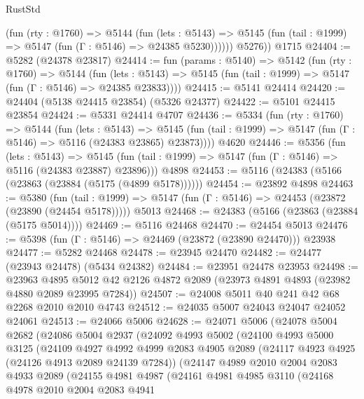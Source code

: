 \begin{lexlean}{RustStd}
\begin{coremodule}
{\begin{coremodule}
{{{{{{{{{{{{{{{{{{{{{{{{{{{{{{{            (fun (rty : @1760) =>
            @5144
              (fun (lets : @5143) =>
              @5145 (fun (tail : @1999) => @5147 (fun (Γ : @5146) => @24385 @5230))))))
        @5276))
    @1715
@24404 := @5282 (@24378 @23817)
@24414 := fun (params : @5140) =>
  @5142
    (fun (rty : @1760) =>
    @5144
      (fun (lets : @5143) =>
      @5145 (fun (tail : @1999) => @5147 (fun (Γ : @5146) => @24385 @23833))))
@24415 := @5141 @24414
@24420 := @24404 (@5138 @24415 @23854) (@5326 @24377)
@24422 := @5101 @24415 @23854
@24424 := @5331 @24414 @4707
@24436 := @5334
    (fun (rty : @1760) =>
    @5144
      (fun (lets : @5143) =>
      @5145 (fun (tail : @1999) => @5147 (fun (Γ : @5146) => @5116 (@24383 @23865) @23873))))
    @4620
@24446 := @5356
    (fun (lets : @5143) =>
    @5145 (fun (tail : @1999) => @5147 (fun (Γ : @5146) => @5116 (@24383 @23887) @23896)))
    @4898
@24453 := @5116 (@24383 (@5166 (@23863 (@23884 (@5175 (@4899 @5178))))))
@24454 := @23892 @4898
@24463 := @5380
    (fun (tail : @1999) => @5147 (fun (Γ : @5146) => @24453 (@23872 (@23890 (@24454 @5178)))))
    @5013
@24468 := @24383 (@5166 (@23863 (@23884 (@5175 @5014))))
@24469 := @5116 @24468
@24470 := @24454 @5013
@24476 := @5398 (fun (Γ : @5146) => @24469 (@23872 (@23890 @24470))) @23938
@24477 := @5282 @24468
@24478 := @23945 @24470
@24482 := @24477 (@23943 @24478) (@5434 @24382)
@24484 := @23951 @24478 @23953
@24498 := @23963
    @4895
    @5012
    @42
    @2126
    @4872
    @2089
    (@23973 @4891 @4893 (@23982 @4880 @2089 @23995 @7284))
@24507 := @24008 @5011 @40 @241 @42 @68 @2268 @2010 @2010 @4743
@24512 := @24035 @5007 @24043 @24047 @24052 @24061
@24513 := @24066 @5006
@24628 := @24071
    @5006
    (@24078
      @5004
      @2682
      (@24086
        @5004
        @2937
        (@24092
          @4993
          @5002
          (@24100
            @4993
            @5000
            @3125
            (@24109
              @4927
              @4992
              @4999
              @2083
              @4905
              @2089
              (@24117 @4923 @4925 (@24126 @4913 @2089 @24139 @7284))
              (@24147
                @4989
                @2010
                @2004
                @2083
                @4933
                @2089
                (@24155
                  @4981
                  @4987
                  (@24161
                    @4981
                    @4985
                    @3110
                    (@24168
                      @4978
                      @2010
                      @2004
                      @2083
                      @4941
}}}}}}}}}}}}}}}}}}}}}}}}}}}}}}}
\end{coremodule}}
\end{coremodule}
\end{lexlean}
